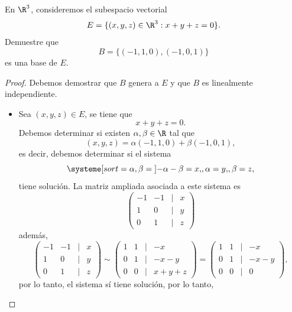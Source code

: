 \documentclass[a4,11pt]{aleph-notas}
\begin{document}
\encabezado

\begin{ejer}
    En $\R^3$, consideremos el subespacio vectorial
    \[
        E = \{(x,y,z)\in \R^3 : x+y+z=0 \}.
    \]
    Demuestre que 
    \[
        B = \{(-1,1,0) , (-1,0,1)\}
    \]
    es una base de $E$.
\end{ejer}

\begin{proof}
    Debemos demostrar que $B$ genera a $E$ y que $B$ es linealmente independiente.
    \begin{itemize}[leftmargin=*]
    \item
        Sea $(x,y,z)\in E$, se tiene que
        \[
            x+y+z=0.
        \]
        Debemos determinar si existen $\alpha,\beta\in\R$ tal que
        \[
            (x,y,z) = \alpha(-1,1,0)+\beta(-1,0,1),
        \]
        es decir, debemos determinar si el sistema
        \[
            \systeme[sort={\alpha,\beta = {}}]{
                - \alpha-\beta = x{,},
                \alpha = y{,},
                \beta = z{,}
            }
        \]
        tiene solución. La matriz ampliada asociada a este sistema es
        \[
            \begin{pmatrix}
                -1 & -1 & | & x\\
                1 & 0 & | & y\\
                0 & 1 & | & z
            \end{pmatrix}
        \]
        además,
        \[
            \begin{pmatrix}
                -1 & -1 & | & x\\
                1 & 0 & | & y\\
                0 & 1 & | & z
            \end{pmatrix}
            \sim
            \begin{pmatrix}
                1 & 1 & | & -x\\
                0 & 1 & | & -x-y\\
                0 & 0 & | & x+y+z
            \end{pmatrix}
            =
            \begin{pmatrix}
                1 & 1 & | & -x\\
                0 & 1 & | & -x-y\\
                0 & 0 & | & 0
            \end{pmatrix},
        \]
        por lo tanto, el sistema sí tiene solución, por lo tanto, 
        \[
\]
\end{itemize}
\end{proof}
\end{document}
